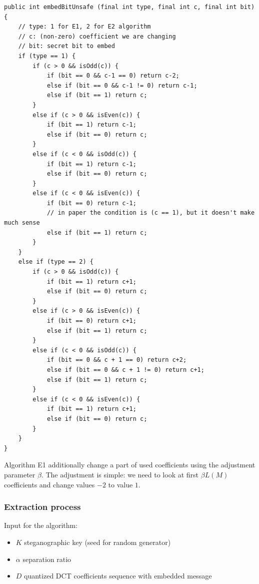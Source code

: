 \begin{lstlisting}
public int embedBitUnsafe (final int type, final int c, final int bit) {
    // type: 1 for E1, 2 for E2 algorithm
    // c: (non-zero) coefficient we are changing
    // bit: secret bit to embed
    if (type == 1) {
        if (c > 0 && isOdd(c)) {
            if (bit == 0 && c-1 == 0) return c-2;
            else if (bit == 0 && c-1 != 0) return c-1;
            else if (bit == 1) return c;
        }
        else if (c > 0 && isEven(c)) {
            if (bit == 1) return c-1;
            else if (bit == 0) return c;
        }
        else if (c < 0 && isOdd(c)) {
            if (bit == 1) return c-1;
            else if (bit == 0) return c;
        }
        else if (c < 0 && isEven(c)) {
            if (bit == 0) return c-1;
            // in paper the condition is (c == 1), but it doesn't make much sense
            else if (bit == 1) return c;
        }
    }
    else if (type == 2) {
        if (c > 0 && isOdd(c)) {
            if (bit == 1) return c+1;
            else if (bit == 0) return c;
        }
        else if (c > 0 && isEven(c)) {
            if (bit == 0) return c+1;
            else if (bit == 1) return c;
        }
        else if (c < 0 && isOdd(c)) {
            if (bit == 0 && c + 1 == 0) return c+2;
            else if (bit == 0 && c + 1 != 0) return c+1;
            else if (bit == 1) return c;
        }
        else if (c < 0 && isEven(c)) {
            if (bit == 1) return c+1;
            else if (bit == 0) return c;
        }
    }
}
\end{lstlisting}

Algorithm E1 additionally change a part of used coefficients using the adjustment
parameter $\beta$. The adjustment is simple: we need to look at first $\beta L(M)$ coefficients and
change values $-2$ to value $1$.

\subsubsection{Extraction process}
Input for the algorithm:

\begin{itemize}
    \item $K$ steganographic key (seed for random generator)
    \item $\alpha$ separation ratio
    \item $D$ quantized DCT coefficients sequence with embedded message
\end{itemize}

